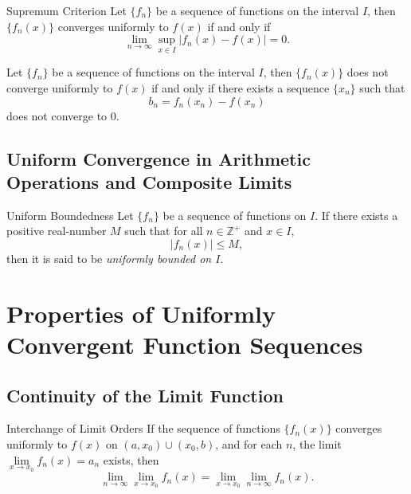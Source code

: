 \begin{theorem}{Supremum Criterion}{}
  Let $\{f_n\}$ be a sequence of functions on the interval $I$, then
  $\{f_n(x)\}$ converges uniformly to $f(x)$ if and only if
  \begin{equation}
    \lim \limits _{n \rightarrow \infty} \sup \limits_{x \in I} |f_n(x) - f(x)| = 0.
  \end{equation}
\end{theorem}

\begin{corollary}{}{}
  Let $\{f_n\}$ be a sequence of functions on the interval $I$, then
  $\{f_n(x)\}$ does not converge uniformly to $f(x)$ if and only if
  there exists a sequence $\{x_n\}$ such that
  \begin{equation}
    b_n = f_n(x_n) - f(x_n)
  \end{equation}
  does not converge to $0$.
\end{corollary}

\subsection{Uniform Convergence in Arithmetic Operations and Composite Limits}

\begin{definition}{Uniform Boundedness}{}
  Let $\{f_n\}$ be a sequence of functions on $I$.
  If there exists a positive real-number $M$ such that for all $n \in \mathbb{Z}^+$ and $x \in I$,
  \begin{equation}
    |f_n(x)| \leq M,
  \end{equation}
  then it is said to be \emph{uniformly bounded on $I$}.
\end{definition}

\section{Properties of Uniformly Convergent Function Sequences}

\subsection{Continuity of the Limit Function}

\begin{theorem}{Interchange of Limit Orders}{}
  If the sequence of functions $\{f_n(x)\}$ converges uniformly to $f(x)$
  on $(a, x_0) \cup (x_0, b)$,
  and for each $n$, the limit $\lim \limits _{x \rightarrow x_0} f_n(x) = a_n$
  exists,
  then
  \begin{equation}
    \lim \limits _{n \rightarrow \infty} \lim \limits _{x \rightarrow x_0} f_n(x) = 
    \lim \limits _{x \rightarrow x_0} \lim \limits _{n \rightarrow \infty} f_n(x).
  \end{equation}
\end{theorem}


